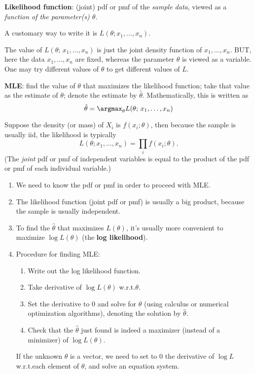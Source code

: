 \documentclass[12pt]{article}
\begin{document}
%
\textbf{Likelihood function}:
(joint) pdf or pmf of the \emph{sample data}, viewed as
a \emph{function of the parameter(s) $\theta$}.

A customary way to write it is
$L(\theta; x_1, \dotsc, x_n)$.

\alert
The value of $L(\theta;\, x_1,\dotsc,x_n)$ is just the joint density function
of $x_1,\dotsc,x_n$. BUT, here the data $x_1,\dotsc,x_n$
are fixed, whereas the parameter $\theta$ is viewed as a variable.
One may try different values of $\theta$ to get different values of $L$.

%
\textbf{MLE}:
find the value of $\theta$ that maximizes the likelihood function;
take that value as the estimate of $\theta$;
denote the estimate by $\hat{\theta}$.
Mathematically, this is written as
\[
\hat{\theta} = \argmax_{\theta} L(\theta;\, x_1,\dotsc,x_n)
\]

Suppose the density (or mass) of $X_i$ is $f(x_i; \theta)$,
then because the sample is usually iid, the likelihood is typically
\[
L(\theta; x_1,\dotsc, x_n) = \prod_i f(x_i; \theta)
.
\]
(The \emph{joint} pdf or pmf of independent variables is equal to
the product of the pdf or pmf of each individual variable.)

\remark
\begin{enumerate}
\item We need to know the pdf or pmf in order to proceed with MLE.
\item The likelihood function (joint pdf or pmf) is usually a big product,
    because the sample is usually independent.
\item To find the $\hat{\theta}$ that maximizes $L(\theta)$,
    it's usually more convenient to maximize
    $\log L(\theta)$ (the \textbf{log likelihood}).
\item Procedure for finding MLE:
    \begin{enumerate}
        \item Write out the log likelihood function.
        \item Take derivative of $\log L(\theta)$ w.r.t.\@ $\theta$.
        \item Set the derivative to 0 and solve for $\theta$
            (using calculus or numerical optimization algorithms),
            denoting the solution by $\hat{\theta}$.
        \item Check that the $\hat{\theta}$ just found is indeed
            a maximizer (instead of a minimizer) of $\log L(\theta)$.
    \end{enumerate}
    If the unknown $\theta$ is a vector,
    we need to set to 0 the derivative of $\log L$ w.r.t.\@ each
    element of $\theta$, and solve an equation system.
\end{enumerate}
\end{document}
